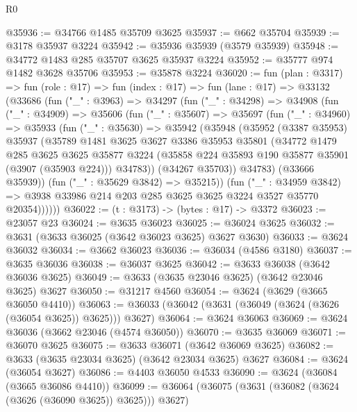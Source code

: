\begin{lexlean}{R0}
\begin{coremodule}
@35936 := @34766 @1485 @35709 @3625
@35937 := @662 @35704
@35939 := @3178 @35937 @3224
@35942 := @35936 @35939 (@3579 @35939)
@35948 := @34772 @1483 @285 @35707 @3625 @35937 @3224
@35952 := @35777 @974 @1482 @3628 @35706
@35953 := @35878 @3224
@36020 := fun (plan : @3317) =>
  fun (role : @17) =>
  fun (index : @17) =>
  fun (lane : @17) =>
  @33132
    (@33686
      (fun ("_" : @3963) =>
      @34297
        (fun ("_" : @34298) =>
        @34908
          (fun ("_" : @34909) =>
          @35606
            (fun ("_" : @35607) =>
            @35697
              (fun ("_" : @34960) =>
              @35933
                (fun ("_" : @35630) =>
                @35942
                  (@35948
                    (@35952
                      (@3387 @35953)
                      @35937
                      (@35789
                        @1481
                        @3625
                        @3627
                        @3386
                        @35953
                        @35801
                        (@34772
                          @1479
                          @285
                          @3625
                          @3625
                          @35877
                          @3224
                          (@35858 @224 @35893 @190 @35877 @35901 (@3907 (@35903 @224)))
                          @34783))
                      (@34267 @35703))
                    @34783)
                  (@33666 @35939))
                (fun ("_" : @35629 @3842) => @35215))
              (fun ("_" : @34959 @3842) =>
              @3938 @33986 @214 @203 @285 @3625 @3625 @3224 @3527 @35770 @20354))))))
@36022 := (t : @3173) -> (bytes : @17) -> @3372
@36023 := @23057 @23
@36024 := @3635 @36023
@36025 := @36024 @3625
@36032 := @3631 (@3633 @36025 (@3642 @36023 @3625) @3627 @3630)
@36033 := @3624 @36032
@36034 := @3662 @36023
@36036 := @36034 (@4586 @3180)
@36037 := @3635 @36036
@36038 := @36037 @3625
@36042 := @3633 @36038 (@3642 @36036 @3625)
@36049 := @3633 (@3635 @23046 @3625) (@3642 @23046 @3625) @3627
@36050 := @31217 @4560
@36054 := @3624 (@3629 (@3665 @36050 @4410))
@36063 := @36033 (@36042 (@3631 (@36049 (@3624 (@3626 (@36054 @3625)) @3625))) @3627)
@36064 := @3624 @36063
@36069 := @3624 @36036 (@3662 @23046 (@4574 @36050))
@36070 := @3635 @36069
@36071 := @36070 @3625
@36075 := @3633 @36071 (@3642 @36069 @3625)
@36082 := @3633 (@3635 @23034 @3625) (@3642 @23034 @3625) @3627
@36084 := @3624 (@36054 @3627)
@36086 := @4403 @36050 @4533
@36090 := @3624 (@36084 (@3665 @36086 @4410))
@36099 := @36064 (@36075 (@3631 (@36082 (@3624 (@3626 (@36090 @3625)) @3625))) @3627)

\end{coremodule}
\end{lexlean}
